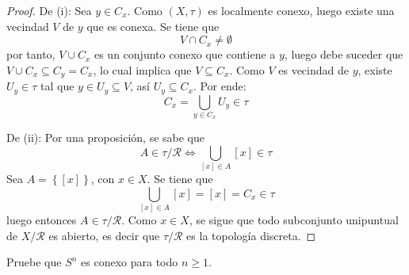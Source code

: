 \documentclass[12pt]{report}
\theoremstyle{largebreak}
\begin{document}
    \begin{proof}
        De (i): Sea $y\in C_x$. Como $(X,\tau)$ es localmente conexo, luego existe una vecindad $V$ de $y$ que es conexa. Se tiene que
        \begin{equation*}
            V\cap C_x\neq\emptyset
        \end{equation*}
        por tanto, $V\cup C_x$ es un conjunto conexo que contiene a $y$, luego debe suceder que $V\cup C_x\subseteq C_y=C_x$, lo cual implica que $V\subseteq C_x$. Como $V$ es vecindad de $y$, existe $U_y\in\tau$ tal que $y\in U_y\subseteq V$, así $U_y\subseteq C_x$. Por ende:
        \begin{equation*}
            C_x=\bigcup_{ y\in C_x}U_y\in\tau
        \end{equation*}

        De (ii): Por una proposición, se sabe que
        \begin{equation*}
            A\in\tau/\mathcal{R}\iff \bigcup_{[x]\in A}[x]\in\tau
        \end{equation*}
        Sea $A=\left\{[x]\right\}$, con $x\in X$. Se tiene que
        \begin{equation*}
            \bigcup_{[x]\in A}[x]=[x]=C_x\in\tau
        \end{equation*}
        luego entonces $A\in\tau/\mathcal{R}$. Como $x\in X$, se sigue que todo subconjunto unipuntual de $X/\mathcal{R}$ es abierto, es decir que $\tau/\mathcal{R}$ es la topología discreta.
    \end{proof}

    \begin{excer}
        Pruebe que $S^n$ es conexo para todo $n\geq1$.
    \end{excer}
\end{document}
